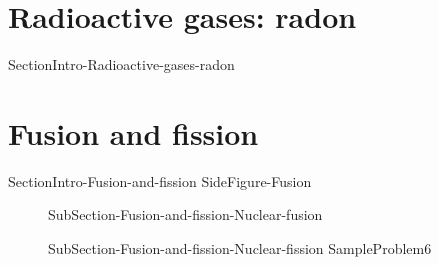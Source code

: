 \documentclass[main.tex]{subfiles}
\newcommand\chapterlabel{Ch-nuclear}\setcounter{figurenewcounter}{0}\setcounter{tablenewcounter}{0}\setcounter{formulanewcounter}{0}\chapterpicture{../{\chapterlabel}/figure1}\chapterpicturelabel{PxFuel}
\begin{document}
\section{Radioactive gases: radon}
{SectionIntro-Radioactive-gases-radon}


\section{Fusion and fission}{SectionIntro-Fusion-and-fission}
{SideFigure-Fusion}
\sloppy \begin{description}
\item[] {SubSection-Fusion-and-fission-Nuclear-fusion}
\item[] {SubSection-Fusion-and-fission-Nuclear-fission}
{SampleProblem6}
\end{description}



\checkoddpage\ifoddpage \clearpage\thispagestyle{empty}\mbox{}\clearpage \else  \fi 
\end{document}
